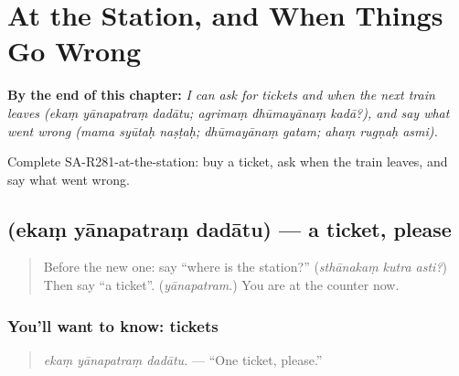 
\chapter{At the Station, and When Things Go Wrong}
\label{ch:sa-at-the-station-and-when-things-go-wrong}

\begin{chapteropening}
\textbf{By the end of this chapter:} \emph{I can ask for tickets and when the next train leaves (ekaṃ yānapatraṃ dadātu; agrimaṃ dhūmayānaṃ kadā?), and say what went wrong (mama syūtaḥ naṣṭaḥ; dhūmayānaṃ gatam; ahaṃ rugṇaḥ asmi).}

Complete SA-R281-at-the-station: buy a ticket, ask when the train leaves, and say what went wrong.
\end{chapteropening}

\section[\texorpdfstring{\sk{एकं} \sk{यानपत्रं} \sk{ददातु} (ekaṃ yānapatraṃ dadātu)}{एकं यानपत्रं ददातु (ekaṃ yānapatraṃ dadātu)}]{   (ekaṃ yānapatraṃ dadātu) — a ticket, please}

\label{lesson:SA-C281-ekam-yanapatram-dadatu}



\begin{quote}
Before the new one: say \textquotedblleft{}where is the station?\textquotedblright{} (\emph{sthānakaṃ kutra asti?}) Then say \textquotedblleft{}a ticket\textquotedblright{}. (\emph{yānapatram}.) You are at the counter now.
\end{quote}

\subsection*{You'll want to know: tickets}
\begin{quote}
\textbf{  }
\end{quote}

\begin{quote}
\emph{ekaṃ yānapatraṃ dadātu.} — \textquotedblleft{}One ticket, please.\textquotedblright{}
\end{quote}

